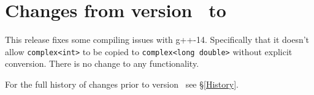 
\section{Changes from version \prevtmvversion\ to \tmvversion}
\label{Changes}

This release fixes some compiling issues with g++-14.  Specifically that it doesn't
allow \texttt{complex<int>} to be copied to \texttt{complex<long double>} without
explicit conversion.  There is no change to any functionality.

For the full history of changes prior to version \tmvversion\ see \S\ref{History}.
